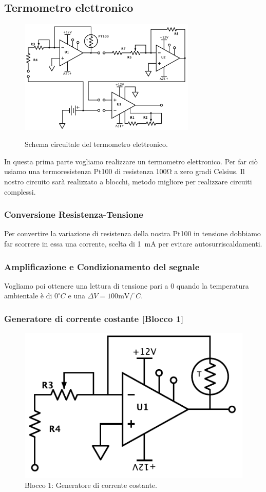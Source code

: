 \subsection{Termometro elettronico}


\begin{figure}[ht]
 \centering
   {\includegraphics[width=0.75\textwidth]{../E06/latex/c1.pdf}}
 \caption{Schema circuitale del termometro elettronico.}
 \label{gr5:sbil_amp_diff}
\end{figure}


In questa prima parte vogliamo realizzare un termometro elettronico. Per far ciò usiamo una termoresistenza Pt100 di resistenza 100\si{\ohm} a zero gradi Celsius. Il nostro circuito sarà realizzato a blocchi, metodo migliore per realizzare circuiti complessi.
\subsubsection*{Conversione Resistenza-Tensione}
Per convertire la variazione di resistenza della nostra Pt100 in tensione dobbiamo far scorrere in essa una corrente, scelta di \SI{1}{\milli\ampere} per evitare autosurriscaldamenti. 

\subsubsection*{Amplificazione e Condizionamento del segnale}
Vogliamo poi ottenere una lettura di tensione pari a 0 quando la temperatura ambientale è di $0^{\circ}C$ e una $\Delta V=100\si{\milli\volt}/^{\circ}C$.




\subsubsection{Generatore di corrente costante [Blocco 1]}

\begin{figure}
\centering
\includegraphics[width=.25\textwidth]{../E06/latex/P1.pdf}
\caption{Blocco 1: Generatore di corrente costante.}
\label{cir5:2wire}
\end{figure}


